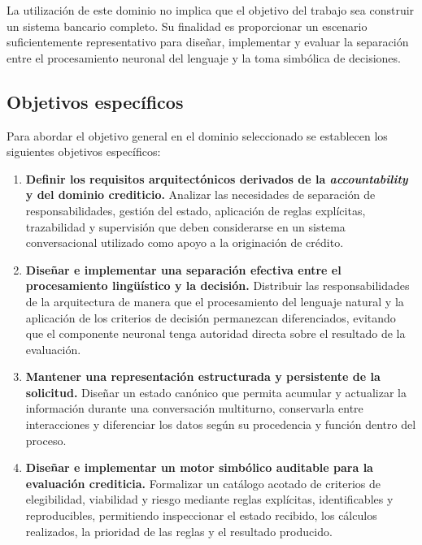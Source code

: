 \documentclass[12pt,a4paper]{report}
\begin{document}
La utilización de este dominio no implica que el objetivo del trabajo sea construir un sistema bancario completo. Su finalidad es proporcionar un escenario suficientemente representativo para diseñar, implementar y evaluar la separación entre el procesamiento neuronal del lenguaje y la toma simbólica de decisiones.

\subsection{Objetivos específicos}

Para abordar el objetivo general en el dominio seleccionado se establecen los siguientes objetivos específicos:

\begin{enumerate}[label=\textbf{OE\arabic*.}, leftmargin=*]
    \item \textbf{Definir los requisitos arquitectónicos derivados de la \textit{accountability} y del dominio crediticio.} Analizar las necesidades de separación de responsabilidades, gestión del estado, aplicación de reglas explícitas, trazabilidad y supervisión que deben considerarse en un sistema conversacional utilizado como apoyo a la originación de crédito.

    \item \textbf{Diseñar e implementar una separación efectiva entre el procesamiento lingüístico y la decisión.} Distribuir las responsabilidades de la arquitectura de manera que el procesamiento del lenguaje natural y la aplicación de los criterios de decisión permanezcan diferenciados, evitando que el componente neuronal tenga autoridad directa sobre el resultado de la evaluación.

    \item \textbf{Mantener una representación estructurada y persistente de la solicitud.} Diseñar un estado canónico que permita acumular y actualizar la información durante una conversación multiturno, conservarla entre interacciones y diferenciar los datos según su procedencia y función dentro del proceso.

    \item \textbf{Diseñar e implementar un motor simbólico auditable para la evaluación crediticia.} Formalizar un catálogo acotado de criterios de elegibilidad, viabilidad y riesgo mediante reglas explícitas, identificables y reproducibles, permitiendo inspeccionar el estado recibido, los cálculos realizados, la prioridad de las reglas y el resultado producido.


\end{enumerate}
\end{document}
